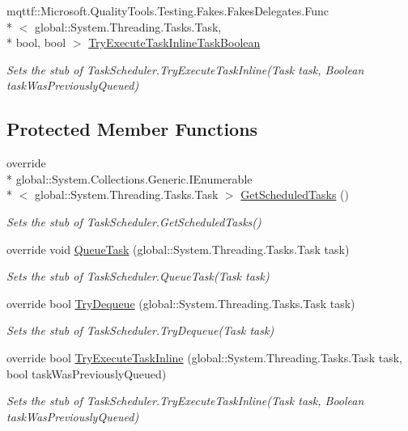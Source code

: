 \begin{DoxyCompactItemize}
mqttf\-::\-Microsoft.\-Quality\-Tools.\-Testing.\-Fakes.\-Fakes\-Delegates.\-Func\\*
$<$ global\-::\-System.\-Threading.\-Tasks.\-Task, \\*
bool, bool $>$ \hyperlink{class_system_1_1_threading_1_1_tasks_1_1_fakes_1_1_stub_task_scheduler_a2d27b9d98c848ee0f09ba1576a86c931}{Try\-Execute\-Task\-Inline\-Task\-Boolean}
\begin{DoxyCompactList}\small\item\em Sets the stub of Task\-Scheduler.\-Try\-Execute\-Task\-Inline(\-Task task, Boolean task\-Was\-Previously\-Queued)\end{DoxyCompactList}\end{DoxyCompactItemize}
\subsection*{Protected Member Functions}
\begin{DoxyCompactItemize}
\item 
override \\*
global\-::\-System.\-Collections.\-Generic.\-I\-Enumerable\\*
$<$ global\-::\-System.\-Threading.\-Tasks.\-Task $>$ \hyperlink{class_system_1_1_threading_1_1_tasks_1_1_fakes_1_1_stub_task_scheduler_a99ae9ccb7f3ef9d9d6b66420be711692}{Get\-Scheduled\-Tasks} ()
\begin{DoxyCompactList}\small\item\em Sets the stub of Task\-Scheduler.\-Get\-Scheduled\-Tasks()\end{DoxyCompactList}\item 
override void \hyperlink{class_system_1_1_threading_1_1_tasks_1_1_fakes_1_1_stub_task_scheduler_aeb2c031dcba3125c2c9bb838d59fb5de}{Queue\-Task} (global\-::\-System.\-Threading.\-Tasks.\-Task task)
\begin{DoxyCompactList}\small\item\em Sets the stub of Task\-Scheduler.\-Queue\-Task(\-Task task)\end{DoxyCompactList}\item 
override bool \hyperlink{class_system_1_1_threading_1_1_tasks_1_1_fakes_1_1_stub_task_scheduler_ad77dcd7288bfba09113690ce662496f8}{Try\-Dequeue} (global\-::\-System.\-Threading.\-Tasks.\-Task task)
\begin{DoxyCompactList}\small\item\em Sets the stub of Task\-Scheduler.\-Try\-Dequeue(\-Task task)\end{DoxyCompactList}\item 
override bool \hyperlink{class_system_1_1_threading_1_1_tasks_1_1_fakes_1_1_stub_task_scheduler_a980999661f98962340432fcd3ab3ae89}{Try\-Execute\-Task\-Inline} (global\-::\-System.\-Threading.\-Tasks.\-Task task, bool task\-Was\-Previously\-Queued)
\begin{DoxyCompactList}\small\item\em Sets the stub of Task\-Scheduler.\-Try\-Execute\-Task\-Inline(\-Task task, Boolean task\-Was\-Previously\-Queued)\end{DoxyCompactList}\end{DoxyCompactItemize}
